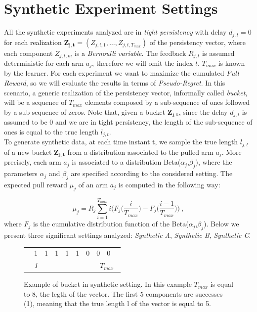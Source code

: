 \section{Synthetic Experiment Settings}
All the synthetic experiments analyzed are in \emph{tight persistency} with delay $d_{j,t}=0$ for each realization $\boldsymbol{Z_{j,t}} = (Z_{j,t,1},\dots,Z_{j,t,T_{max}})$ of the persistency vector, where each component $Z_{j,t,m}$ is a \emph{Bernoulli variable}. The feedback $R_{j, t}$ is assumed deterministic for each arm $a_j$, therefore we will omit the index $t$. $T_{max}$ is known by the learner. For each experiment we want to maximize the cumulated \emph{Pull Reward}, so we will evaluate the results in terms of \emph{Pseudo-Regret}. In this scenario, a generic realization of the persistency vector, informally called \emph{bucket}, will be a sequence of $T_{max}$ elements composed by a sub-sequence of ones followed by a sub-sequence of zeros. Note that, given a bucket $\boldsymbol{Z_{j,t}}$, since the delay $d_{j,t}$ is assumed to be 0 and we are in tight persistency, the length of the sub-sequence of ones is equal to the true length $l_{j,t}$.\\
To generate synthetic data, at each time instant t, we sample the true length $l_{j,t}$ of a new bucket $\boldsymbol{Z_{j,t}}$ from a distribution associated to the pulled arm $a_j$. More precisely, each arm $a_j$ is associated to a distribution Beta($\alpha_j$,$\beta_j$), where the parameters $\alpha_j$ and $\beta_j$ are specified according to the considered setting. The expected pull reward $\mu_j$ of an arm $a_j$ is computed in the following way:

$$\mu_j = R_j\sum_{i=1}^{T_{max}}i\bigg(F_j\bigg(\frac{i}{T_{max}}\bigg)-F_j\bigg(\frac{i-1}{T_{max}}\bigg)\bigg) \ ,$$
where $F_j$ is the cumulative distribution function of the Beta($\alpha_j$,$\beta_j$).
Below we present three significant settings analyzed: \emph{Synthetic A}, \emph{Synthetic B}, \emph{Synthetic C}.

\begin{figure}[t]
	\centering
	\begin{tabular}{llllllllll}
		\cline{2-9}
		\multicolumn{1}{l|}{} & \multicolumn{1}{l|}{1} & \multicolumn{1}{l|}{1} & \multicolumn{1}{l|}{1} & \multicolumn{1}{l|}{1} & \multicolumn{1}{l|}{1} & \multicolumn{1}{l|}{0} & \multicolumn{1}{l|}{0} & \multicolumn{1}{l|}{0} &  \\ \cline{2-9}
		& \textit{1}             & \textit{}              &                        &                        &                        &                        & \multicolumn{3}{c}{\textit{ $T_{max}$}}                 
	\end{tabular}
	\caption{Example of bucket in synthetic setting. In this example $T_{max}$ is equal to 8, the legth of the vector. The first 5 components are successes (1), meaning that the true length l of the vector is equal to 5.}
\end{figure}
